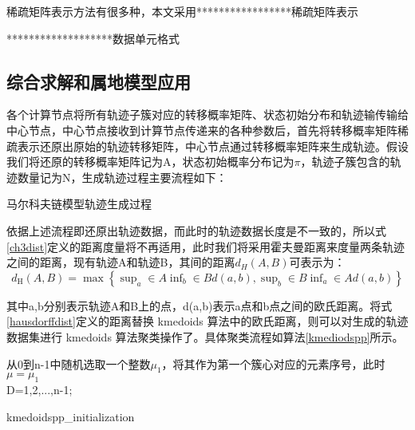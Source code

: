 稀疏矩阵表示方法有很多种，本文采用*****************稀疏矩阵表示


*******************数据单元格式

\subsection{综合求解和属地模型应用}
各个计算节点将所有轨迹子簇对应的转移概率矩阵、状态初始分布和轨迹输传输给中心节点，中心节点接收到计算节点传递来的各种参数后，首先将转移概率矩阵稀疏表示还原出原始的轨迹转移矩阵，中心节点通过转移概率矩阵来生成轨迹。假设我们将还原的转移概率矩阵记为A，状态初始概率分布记为$\pi$，轨迹子簇包含的轨迹数量记为N，生成轨迹过程主要流程如下：\\
\begin{algorithm}[H]
	 \caption{马尔科夫链模型轨迹生成过程}
\end{algorithm}

依据上述流程即还原出轨迹数据，而此时的轨迹数据长度是不一致的，所以式\ref{ch3dist}定义的距离度量将不再适用，此时我们将采用霍夫曼距离来度量两条轨迹之间的距离，现有轨迹A和轨迹B，其间的距离$d_H(A,B)$可表示为：
\begin{equation}
\label{hausdorffdist}
d_{\text{H}}\left( A,B \right) =\max \left\{ \mathop{\text{sup}}_a\in A\mathop{\text{inf}}_b\in Bd\left( a,b \right) ,\mathop{\text{sup}}_b\in B\mathop{\text{inf}}_a\in Ad\left( a,b \right) \right\} 
\end{equation}

其中a,b分别表示轨迹A和B上的点，d(a,b)表示a点和b点之间的欧氏距离。将式\ref{hausdorffdist}定义的距离替换 kmedoids 算法中的欧氏距离，则可以对生成的轨迹数据集进行 kmedoids 算法聚类操作了。具体聚类流程如算法\ref{kmediodspp}所示。

\begin{algorithm}[H]
	 从0到n-1中随机选取一个整数$\mu_1$，将其作为第一个簇心对应的元素序号，此时$\mu={\mu_1}$\;\\
	 D={1,2,...,n-1};\\
	 \caption{kmedoidspp_initialization}
\end{algorithm}

